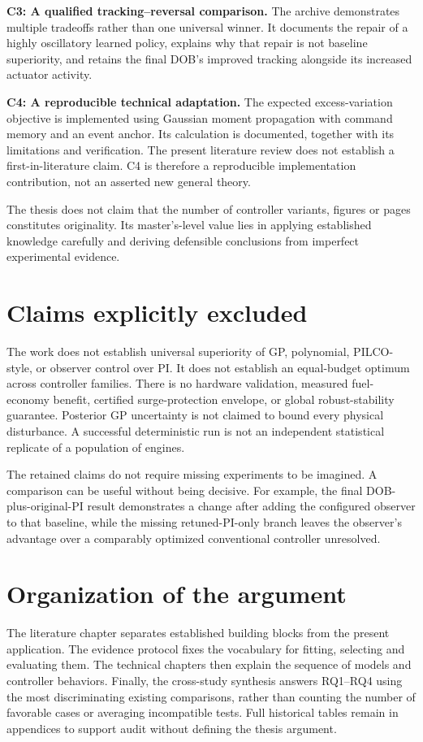\textbf{C3: A qualified tracking--reversal comparison.} The archive demonstrates multiple tradeoffs rather than one universal winner. It documents the repair of a highly oscillatory learned policy, explains why that repair is not baseline superiority, and retains the final DOB's improved tracking alongside its increased actuator activity.

\textbf{C4: A reproducible technical adaptation.} The expected excess-variation objective is implemented using Gaussian moment propagation with command memory and an event anchor. Its calculation is documented, together with its limitations and verification. The present literature review does not establish a first-in-literature claim. C4 is therefore a reproducible implementation contribution, not an asserted new general theory.

The thesis does not claim that the number of controller variants, figures or pages constitutes originality. Its master's-level value lies in applying established knowledge carefully and deriving defensible conclusions from imperfect experimental evidence.

\section{Claims explicitly excluded}
The work does not establish universal superiority of GP, polynomial, PILCO-style, or observer control over PI. It does not establish an equal-budget optimum across controller families. There is no hardware validation, measured fuel-economy benefit, certified surge-protection envelope, or global robust-stability guarantee. Posterior GP uncertainty is not claimed to bound every physical disturbance. A successful deterministic run is not an independent statistical replicate of a population of engines.

The retained claims do not require missing experiments to be imagined. A comparison can be useful without being decisive. For example, the final DOB-plus-original-PI result demonstrates a change after adding the configured observer to that baseline, while the missing retuned-PI-only branch leaves the observer's advantage over a comparably optimized conventional controller unresolved.

\section{Organization of the argument}
The literature chapter separates established building blocks from the present application. The evidence protocol fixes the vocabulary for fitting, selecting and evaluating them. The technical chapters then explain the sequence of models and controller behaviors. Finally, the cross-study synthesis answers RQ1--RQ4 using the most discriminating existing comparisons, rather than counting the number of favorable cases or averaging incompatible tests. Full historical tables remain in appendices to support audit without defining the thesis argument.
